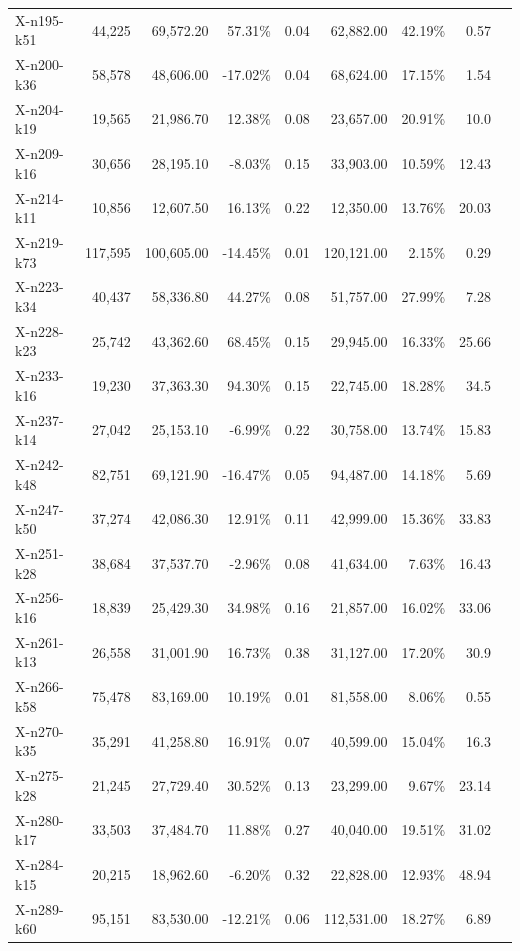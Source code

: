 \documentclass[12pt,a4paper]{article}
\begin{document}
\begin{longtable}{@{}lrrrrrrrr@{}}
    X-n195-k51 & 44,225 & 69,572.20 & 57.31\% & 0.04 & 62,882.00 & 42.19\% & 0.57 \\
    X-n200-k36 & 58,578 & 48,606.00 & -17.02\% & 0.04 & 68,624.00 & 17.15\% & 1.54 \\
    X-n204-k19 & 19,565 & 21,986.70 & 12.38\% & 0.08 & 23,657.00 & 20.91\% & 10.0 \\
    X-n209-k16 & 30,656 & 28,195.10 & -8.03\% & 0.15 & 33,903.00 & 10.59\% & 12.43 \\
    X-n214-k11 & 10,856 & 12,607.50 & 16.13\% & 0.22 & 12,350.00 & 13.76\% & 20.03 \\
    X-n219-k73 & 117,595 & 100,605.00 & -14.45\% & 0.01 & 120,121.00 & 2.15\% & 0.29 \\
    X-n223-k34 & 40,437 & 58,336.80 & 44.27\% & 0.08 & 51,757.00 & 27.99\% & 7.28 \\
    X-n228-k23 & 25,742 & 43,362.60 & 68.45\% & 0.15 & 29,945.00 & 16.33\% & 25.66 \\
    X-n233-k16 & 19,230 & 37,363.30 & 94.30\% & 0.15 & 22,745.00 & 18.28\% & 34.5 \\
    X-n237-k14 & 27,042 & 25,153.10 & -6.99\% & 0.22 & 30,758.00 & 13.74\% & 15.83 \\
    X-n242-k48 & 82,751 & 69,121.90 & -16.47\% & 0.05 & 94,487.00 & 14.18\% & 5.69 \\
    X-n247-k50 & 37,274 & 42,086.30 & 12.91\% & 0.11 & 42,999.00 & 15.36\% & 33.83 \\
    X-n251-k28 & 38,684 & 37,537.70 & -2.96\% & 0.08 & 41,634.00 & 7.63\% & 16.43 \\
    X-n256-k16 & 18,839 & 25,429.30 & 34.98\% & 0.16 & 21,857.00 & 16.02\% & 33.06 \\
    X-n261-k13 & 26,558 & 31,001.90 & 16.73\% & 0.38 & 31,127.00 & 17.20\% & 30.9 \\
    X-n266-k58 & 75,478 & 83,169.00 & 10.19\% & 0.01 & 81,558.00 & 8.06\% & 0.55 \\
    X-n270-k35 & 35,291 & 41,258.80 & 16.91\% & 0.07 & 40,599.00 & 15.04\% & 16.3 \\
    X-n275-k28 & 21,245 & 27,729.40 & 30.52\% & 0.13 & 23,299.00 & 9.67\% & 23.14 \\
    X-n280-k17 & 33,503 & 37,484.70 & 11.88\% & 0.27 & 40,040.00 & 19.51\% & 31.02 \\
    X-n284-k15 & 20,215 & 18,962.60 & -6.20\% & 0.32 & 22,828.00 & 12.93\% & 48.94 \\
    X-n289-k60 & 95,151 & 83,530.00 & -12.21\% & 0.06 & 112,531.00 & 18.27\% & 6.89 \\

\end{longtable}
\end{document}
